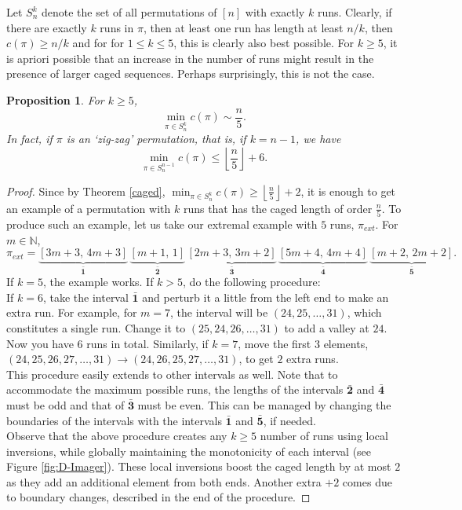 \documentclass[11pt, a4paper]{article}
\theoremstyle{compact}
\newtheorem{proposition}[theorem]{Proposition}
\begin{document}
Let $S_n^k$ denote the set of all permutations of $[n]$ with exactly $k$ runs. Clearly, if there are exactly $k$ runs in $\pi$, then at least one run has length at least $n/k$, then $c(\pi)\ge  n/k$ and for for $1\le k\le 5$, this is clearly also best possible.  For $k\ge 5$, it is apriori possible that an increase in the number of runs might result in the presence of larger caged sequences. Perhaps surprisingly, this is not the case.
\begin{proposition}
    For $k \geq 5$, 
    \[
    \min_{\pi \in S_n^k} c(\pi) \sim \frac{n}{5}.
    \]
    In fact, if $\pi$ is an `zig-zag' permutation, that is, if $k=n-1$, we have
    \[
    \min_{\pi \in S_n^{n-1}} c(\pi) \leq \left\lfloor \frac{n}{5} \right\rfloor + 6.
    \]
\end{proposition}
\begin{proof}
    Since by Theorem \ref{caged}, $\displaystyle\min_{\pi \in S_n^k} c(\pi) \geq \left\lfloor\frac{n}{5}\right\rfloor + 2$, it is enough to get an example of a permutation with $k$ runs that has the caged length of order $\displaystyle\frac{n}{5}$. To produce such an example, let us take our extremal example with $5$ runs, $\pi_{ext} $. For $m \in \mathbb{N}$,
    \[
    \pi_{ext}  = \underbrace{[3m+3, \, 4m+3]}_\text{$\bar{\mathbf{1}}$}\,\underbrace{[m+1, \,1]}_\text{$\bar{\mathbf{2}}$}\,\underbrace{[2m+3, \,3m+2]}_\text{$\bar{\mathbf{3}}$}\,\underbrace{[5m+4, \,4m+4]}_\text{$\bar{\mathbf{4}}$}\,\underbrace{[m+2,\,2m+2]}_\text{$\bar{\mathbf{5}}$}.
    \]
    If $k = 5$, the example works. If $k > 5$, do the following procedure: \\
    If $k = 6$, take the interval $\bar{\mathbf{1}}$ and perturb it a little from the left end to make an extra run. For example, for $m = 7$, the interval will be $(24, 25, \dots, 31)$, which constitutes a single run. Change it to $(25, 24, 26, \dots, 31)$ to add a valley at $24$. Now you have $6$ runs in total. Similarly, if $k = 7$, move the first $3$ elements, $(24, 25, 26, 27, \dots, 31) \longrightarrow (24, 26, 25, 27, \dots , 31)$, to get $2$ extra runs. \\
    This procedure easily extends to other intervals as well. Note that to accommodate the maximum possible runs, the lengths of the intervals $\bar{\mathbf{2}}$ and $\bar{\mathbf{4}}$ must be odd and that of $\bar{\mathbf{3}}$ must be even. This can be managed by changing the boundaries of the intervals with the intervals $\bar{\mathbf{1}}$ and $\bar{\mathbf{5}}$, if needed. \\
    Observe that the above procedure creates any $k \geq 5$ number of runs using local inversions, while globally maintaining the monotonicity of each interval (see Figure \ref{fig:D-Imager}). These local inversions boost the caged length by at most $2$ as they add an additional element from both ends. Another extra $+2$ comes due to boundary changes, described in the end of the procedure. 

\end{proof}
\end{document}
